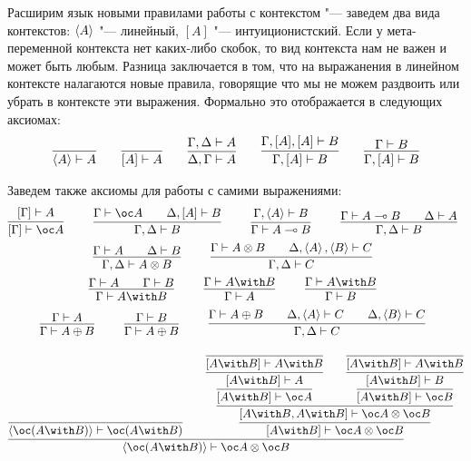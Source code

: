 Расширим язык новыми правилами работы с контекстом "--- заведем два вида контекстов: $\left<A\right>$ "--- линейный, $[A]$ "--- интуиционистский.
Если у мета-переменной контекста нет каких-либо скобок, то вид контекста нам не важен и может быть любым.
Разница заключается в том, что на выражанения в линейном контексте налагаются новые правила,
говорящие что мы не можем раздвоить или убрать в контексте эти выражения. Формально это отображается в следующих аксиомах:
\begin{gather*}
	\infer{\pair{A} \vdash A}{} \qquad
    \infer{[A] \vdash A}{} \qquad
    \infer{\Delta, \Gamma \vdash A}{\Gamma, \Delta \vdash A} \qquad
    \infer{\Gamma, [A] \vdash B}{\Gamma, [A], [A] \vdash B} \qquad
    \infer{\Gamma, [A] \vdash B}{\Gamma \vdash B} \\
\end{gather*}

Заведем также аксиомы для работы с самими выражениями:
\begin{gather*}
	\infer[]{[\Gamma] \vdash \oc A}{[\Gamma] \vdash A} \qquad
	\infer[]{\Gamma, \Delta \vdash B}{\Gamma \vdash \oc A && \Delta, [A] \vdash B} \qquad
	\infer[]{\Gamma \vdash A \multimap B}{\Gamma, \pair{A} \vdash B} \qquad
	\infer[]{\Gamma, \Delta \vdash B}{\Gamma \vdash A \multimap B && \Delta \vdash A} \\
	\infer[]{\Gamma, \Delta \vdash A \otimes B}{\Gamma \vdash A && \Delta \vdash B} \qquad
	\infer[]{\Gamma, \Delta \vdash C}{\Gamma \vdash A \otimes B && \Delta, \pair{A}, \pair{B} \vdash C} \\
	\infer[]{\Gamma \vdash A \with B}{\Gamma \vdash A && \Gamma \vdash B} \qquad
	\infer[]{\Gamma \vdash A}{\Gamma \vdash A \with B} \qquad
	\infer[]{\Gamma \vdash B}{\Gamma \vdash A \with B} \\
	\infer[]{\Gamma \vdash A \oplus B}{\Gamma \vdash A} \qquad
	\infer[]{\Gamma \vdash A \oplus B}{\Gamma \vdash B} \qquad
	\infer[]{\Gamma, \Delta \vdash C}{\Gamma \vdash A \oplus B && \Delta, \pair{A} \vdash C && \Delta, \pair{B} \vdash C}
\end{gather*}
\begin{example}
\[
	\infer{\pair{\oc (A \with B)} \vdash \oc A \otimes \oc B} {
		\infer{\pair{\oc (A \with B)} \vdash \oc (A \with B)}{}
        &&
        \infer{[A \with B] \vdash \oc A \otimes \oc B} {
            \infer{[A \with B, A \with B] \vdash \oc A \otimes \oc B}{
                \infer{[A \with B] \vdash \oc A} {
                    \infer{[A \with B] \vdash A} {
                        \infer{[A \with B] \vdash A \with B}{}
                    }
                }
                &&
                \infer{[A \with B] \vdash \oc B} {
                    \infer{[A \with B] \vdash B} {
                        \infer{[A \with B] \vdash A \with B}{}
                    }
                }
            }
        }
    }
\]
\end{example}

